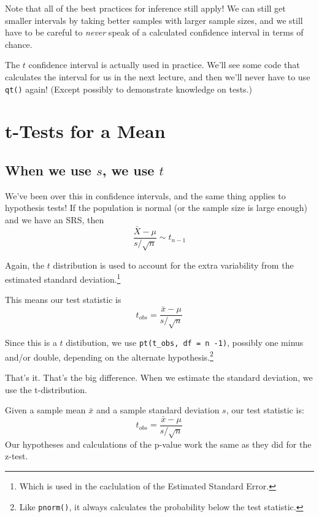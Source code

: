 \documentclass[
  letterpaper,
  DIV=11,
  numbers=noendperiod]{scrreprt}
\begin{document}
Note that all of the best practices for inference still apply! We can
still get smaller intervals by taking better samples with larger sample
sizes, and we still have to be careful to \emph{never} speak of a
calculated confidence interval in terms of chance.

The \(t\) confidence interval is actually used in practice. We'll see
some code that calculates the interval for us in the next lecture, and
then we'll never have to use \texttt{qt()} again! (Except possibly to
demonstrate knowledge on tests.)

\hypertarget{t-tests-for-a-mean}{%
\chapter{t-Tests for a Mean}\label{t-tests-for-a-mean}}

\hypertarget{when-we-use-s-we-use-t}{%
\section{\texorpdfstring{When we use \(s\), we use
\(t\)}{When we use s, we use t}}\label{when-we-use-s-we-use-t}}

We've been over this in confidence intervals, and the same thing applies
to hypothesis tests! If the population is normal (or the sample size is
large enough) and we have an SRS, then \[
\frac{\bar X - \mu}{s/\sqrt{n}}\sim t_{n-1}
\]

Again, the \(t\) distribution is used to account for the extra
variability from the estimated standard deviation.\footnote{Which is
  used in the caclulation of the Estimated Standard Error.}

This means our test statistic is \[
t_{obs} = \frac{\bar x - \mu}{s/\sqrt{n}}
\]

Since this is a \(t\) distibution, we use
\texttt{pt(t\_obs,\ df\ =\ n\ -1)}, possibly one minus and/or double,
depending on the alternate hypothesis.\footnote{Like \texttt{pnorm()},
  it always calculates the probability below the test statistic.}

That's it. That's the big difference. When we estimate the standard
deviation, we use the t-distribution.

\begin{tcolorbox}[enhanced jigsaw, toptitle=1mm, colbacktitle=quarto-callout-warning-color!10!white, breakable, leftrule=.75mm, left=2mm, opacityback=0, colframe=quarto-callout-warning-color-frame, rightrule=.15mm, toprule=.15mm, bottomtitle=1mm, titlerule=0mm, title=\textcolor{quarto-callout-warning-color}{\faExclamationTriangle}\hspace{0.5em}{The t-test for a population mean}, arc=.35mm, colback=white, bottomrule=.15mm, opacitybacktitle=0.6, coltitle=black]

Given a sample mean \(\bar x\) and a sample standard deviation \(s\),
our test statistic is: \[
t_{obs} = \frac{\bar x - \mu}{s/\sqrt{n}}
\] Our hypotheses and calculations of the p-value work the same as they
did for the z-test.

\end{tcolorbox}
\end{document}
